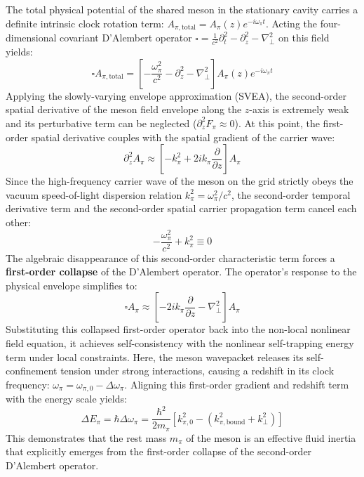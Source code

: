 \documentclass[12pt, a4paper]{article}
\begin{document}
The total physical potential of the shared meson in the stationary cavity carries a definite intrinsic clock rotation term: $A_{\pi, \mathrm{total}} = A_\pi(z) e^{-i\omega_\pi t}$. Acting the four-dimensional covariant D'Alembert operator $\square = \frac{1}{c^2}\partial_t^2 - \partial_z^2 - \nabla_\perp^2$ on this field yields:
\begin{equation}
\square A_{\pi, \mathrm{total}} = \left[ -\frac{\omega_\pi^2}{c^2} - \partial_z^2 - \nabla_\perp^2 \right] A_\pi(z) e^{-i\omega_\pi t}
\end{equation}
Applying the slowly-varying envelope approximation (SVEA), the second-order spatial derivative of the meson field envelope along the $z$-axis is extremely weak and its perturbative term can be neglected ($\partial_z^2 F_\pi \approx 0$). At this point, the first-order spatial derivative couples with the spatial gradient of the carrier wave:
\begin{equation}
\partial_z^2 A_\pi \approx \left[ -k_\pi^2 + 2i k_\pi \frac{\partial}{\partial z} \right] A_\pi
\end{equation}
Since the high-frequency carrier wave of the meson on the grid strictly obeys the vacuum speed-of-light dispersion relation $k_\pi^2 = \omega_\pi^2 / c^2$, the second-order temporal derivative term and the second-order spatial carrier propagation term cancel each other:
\begin{equation}
-\frac{\omega_\pi^2}{c^2} + k_\pi^2 \equiv 0
\end{equation}
The algebraic disappearance of this second-order characteristic term forces a \textbf{first-order collapse} of the D'Alembert operator. The operator's response to the physical envelope simplifies to:
\begin{equation}
\square A_{\pi} \approx \left[ -2i k_\pi \frac{\partial}{\partial z} - \nabla_\perp^2 \right] A_{\pi}
\end{equation}
Substituting this collapsed first-order operator back into the non-local nonlinear field equation, it achieves self-consistency with the nonlinear self-trapping energy term under local constraints. Here, the meson wavepacket releases its self-confinement tension under strong interactions, causing a redshift in its clock frequency: $\omega_\pi = \omega_{\pi, 0} - \Delta \omega_\pi$. Aligning this first-order gradient and redshift term with the energy scale yields:
\begin{equation}
\Delta E_\pi = \hbar \Delta \omega_\pi = \frac{\hbar^2}{2m_\pi} \left[ k_{\pi, 0}^2 - \left( k_{\pi, \mathrm{bound}}^2 + k_\perp^2 \right) \right]
\end{equation}
This demonstrates that the rest mass $m_\pi$ of the meson is an effective fluid inertia that explicitly emerges from the first-order collapse of the second-order D'Alembert operator.
\end{document}
